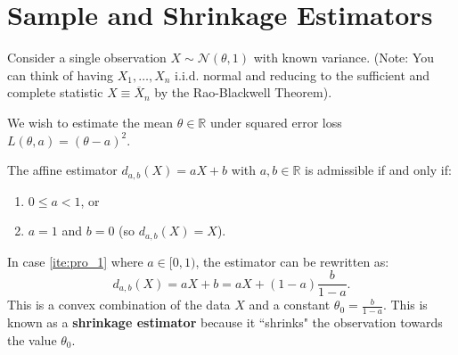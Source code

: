 \section{Sample and Shrinkage Estimators}
\label{sec:sample_shrinkage}

Consider a single observation \(X \sim \mathcal{N}(\theta, 1)\) with known variance.
(Note: You can think of having \(X_1, \dots, X_n\) i.i.d. normal and reducing to the sufficient and complete statistic \(X \equiv \overline{X}_n\) by the Rao-Blackwell Theorem).

We wish to estimate the mean \(\theta \in \mathbb{R}\) under squared error loss \(L(\theta, a) = (\theta - a)^2\).

\begin{pro}
\label{prop:affine_admissibility}
The affine estimator \(d_{a,b}(X) = aX + b\) with \(a,b \in \mathbb{R}\) is admissible if and only if:
\begin{enumerate}[label=\roman*)]
    \item \label{ite:pro_1} \(0 \le a < 1\), or
    \item \(a = 1\) and \(b = 0\) (so \(d_{a,b}(X) = X\)).
\end{enumerate}
\end{pro}

\begin{remark}
    In case \ref{ite:pro_1} where \(a \in [0, 1)\), the estimator can be rewritten as:
\[ d_{a,b}(X) = aX + b = aX + (1-a) \frac{b}{1-a}. \]
This is a convex combination of the data \(X\) and a constant \(\theta_0 = \frac{b}{1-a}\). This is known as a \textbf{shrinkage estimator} because it ``shrinks" the observation towards the value \(\theta_0\).
\end{remark}



